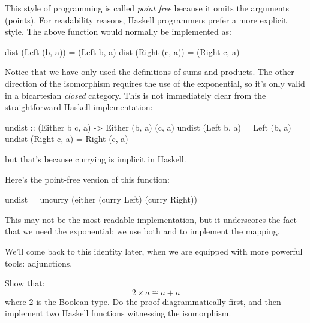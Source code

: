 \documentclass[DaoFP]{subfiles}
\begin{document}
This style of programming is called \emph{point free} because it omits the arguments (points). For readability reasons, Haskell programmers prefer a more explicit style. The above function would normally be implemented as:
\begin{haskell}
dist (Left  (b, a)) = (Left  b, a)
dist (Right (c, a)) = (Right c, a)
\end{haskell}

Notice that we have only used the definitions of sums and products. The other direction of the isomorphism requires the use of the exponential, so it's only valid in a bicartesian \emph{closed} category. This is not immediately clear from the straightforward Haskell implementation:
\begin{haskell}
undist :: (Either b c, a) -> Either (b, a) (c, a)
undist (Left b, a)  = Left (b, a)
undist (Right c, a) = Right (c, a)
\end{haskell}
but that's because currying is implicit in Haskell. 

Here's the point-free version of this function:
\begin{haskell}
undist = uncurry (either (curry Left) (curry Right))
\end{haskell}
This may not be the most readable implementation, but it underscores the fact that we need the exponential: we use both  and  to implement the mapping.

We'll come back to this identity later, when we are equipped with more powerful tools: adjunctions.

\begin{exercise}
Show that:
\[ 2 \times a \cong a + a \]
where $2$ is the Boolean type. Do the proof diagrammatically first, and then implement two Haskell functions witnessing the isomorphism.
\end{exercise}
\end{document}
